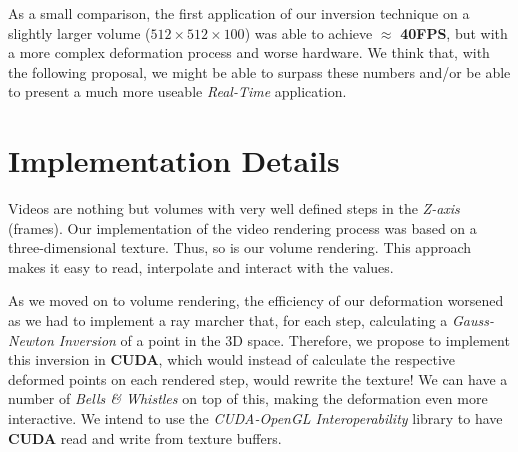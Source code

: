 \documentclass[11pt]{article}
\begin{document}
    As a small comparison, the first application of our inversion technique on a
slightly larger volume ($512 \times 512 \times 100$) was able to achieve $\approx$
\textbf{40FPS}, but with a more complex deformation process and worse hardware.
We think that, with the following proposal, we might be able to surpass these numbers
and/or be able to present a much more useable \textit{Real-Time} application.


  \section*{Implementation Details}

    Videos are nothing but volumes with very well defined steps in the
\textit{Z-axis} (frames). Our implementation of the video rendering process was
based on a three-dimensional texture. Thus, so is our volume rendering. This approach
makes it easy to read, interpolate and interact with the values.

    As we moved on to volume rendering, the efficiency of our deformation
worsened as we had to implement a ray marcher that, for each step, calculating a
\textit{Gauss-Newton Inversion} of a point in the 3D space. Therefore, we
propose to implement this inversion in \textbf{CUDA}, which would instead of
calculate the respective deformed points on each rendered step, would rewrite
the texture! We can have a number of \textit{Bells \& Whistles} on top of this,
making the deformation even more interactive. We intend to use the
\textit{CUDA-OpenGL Interoperability} library to have \textbf{CUDA} read and
write from texture buffers.




\end{document}
